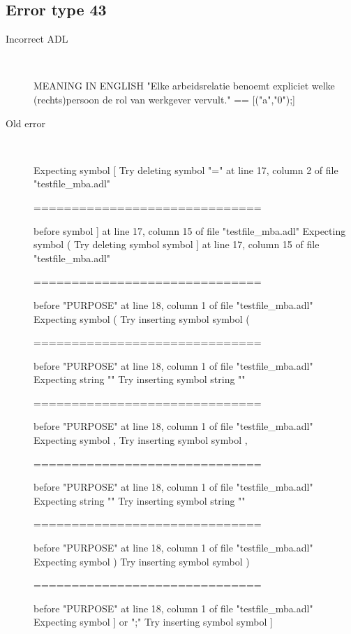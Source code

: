 \subsection{Error type 43}
  \begin{description}
  \item[Incorrect ADL]~\\
\begin{adl}
MEANING IN ENGLISH "Elke arbeidsrelatie benoemt expliciet welke (rechts)persoon de rol van werkgever vervult."
== [("a","0");]     \end{adl}
  \item[Old error]~\\
\begin{haskell}
Expecting symbol [
Try deleting symbol "=" at line 17, column 2 of file "testfile_mba.adl"

==============================

before symbol ] at line 17, column 15 of file "testfile_mba.adl"
Expecting symbol (
Try deleting symbol symbol ] at line 17, column 15 of file "testfile_mba.adl"

==============================

before "PURPOSE" at line 18, column 1 of file "testfile_mba.adl"
Expecting symbol (
Try inserting symbol symbol (

==============================

before "PURPOSE" at line 18, column 1 of file "testfile_mba.adl"
Expecting string ""
Try inserting symbol string ""

==============================

before "PURPOSE" at line 18, column 1 of file "testfile_mba.adl"
Expecting symbol ,
Try inserting symbol symbol ,

==============================

before "PURPOSE" at line 18, column 1 of file "testfile_mba.adl"
Expecting string ""
Try inserting symbol string ""

==============================

before "PURPOSE" at line 18, column 1 of file "testfile_mba.adl"
Expecting symbol )
Try inserting symbol symbol )

==============================

before "PURPOSE" at line 18, column 1 of file "testfile_mba.adl"
Expecting symbol ] or ";"
Try inserting symbol symbol ]


\end{haskell}
\end{description}
